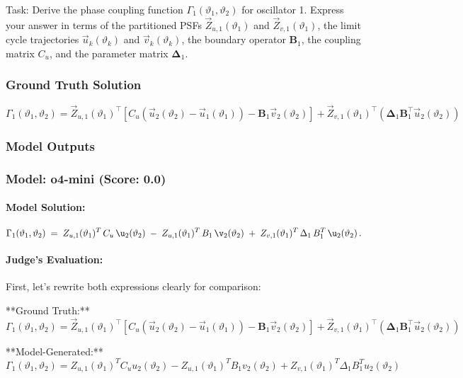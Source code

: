 \documentclass[10pt]{article}
\begin{document}
Task:
Derive the phase coupling function $\Gamma_1(\vartheta_1, \vartheta_2)$ for oscillator 1. Express your answer in terms of the partitioned PSFs $\vec{Z}_{u,1}(\vartheta_1)$ and $\vec{Z}_{v,1}(\vartheta_1)$, the limit cycle trajectories $\vec{u}_k(\vartheta_k)$ and $\vec{v}_k(\vartheta_k)$, the boundary operator $\boldsymbol{B}_1$, the coupling matrix $C_u$, and the parameter matrix $\boldsymbol{\Delta}_1$.

\subsubsection*{Ground Truth Solution}
\[ \boxed{\Gamma_1(\vartheta_1, \vartheta_2) = \vec{Z}_{u,1}(\vartheta_1)^\top \left[ C_u(\vec{u}_2(\vartheta_2) - \vec{u}_1(\vartheta_1)) - \boldsymbol{B}_1 \vec{v}_2(\vartheta_2) \right] + \vec{Z}_{v,1}(\vartheta_1)^\top \left( \boldsymbol{\Delta}_1 \boldsymbol{B}_1^\top \vec{u}_2(\vartheta_2) \right)} \]

\subsubsection*{Model Outputs}
\subsubsection*{Model: o4-mini (Score: 0.0)}
\paragraph*{Model Solution:}
\[ \Gamma_{1}(\vartheta_{1},\vartheta_{2})
\;=\;
Z_{u,1}(\vartheta_{1})^{T}\,C_{u}\,\u_{2}(\vartheta_{2})
\;-\;
Z_{u,1}(\vartheta_{1})^{T}\,B_{1}\,\v_{2}(\vartheta_{2})
\;+\;
Z_{v,1}(\vartheta_{1})^{T}\,\Delta_{1}\,B_{1}^{T}\,\u_{2}(\vartheta_{2})\,. \]

\paragraph*{Judge's Evaluation:}

First, let's rewrite both expressions clearly for comparison:

**Ground Truth:**
\[
\Gamma_1(\vartheta_1, \vartheta_2) = \vec{Z}_{u,1}(\vartheta_1)^\top \left[ C_u(\vec{u}_2(\vartheta_2) - \vec{u}_1(\vartheta_1)) - \boldsymbol{B}_1 \vec{v}_2(\vartheta_2) \right] + \vec{Z}_{v,1}(\vartheta_1)^\top \left( \boldsymbol{\Delta}_1 \boldsymbol{B}_1^\top \vec{u}_2(\vartheta_2) \right)
\]

**Model-Generated:**
\[
\Gamma_1(\vartheta_1, \vartheta_2) = Z_{u,1}(\vartheta_1)^{T} C_u u_2(\vartheta_2) - Z_{u,1}(\vartheta_1)^{T} B_1 v_2(\vartheta_2) + Z_{v,1}(\vartheta_1)^{T} \Delta_1 B_1^{T} u_2(\vartheta_2)
\]
\end{document}
